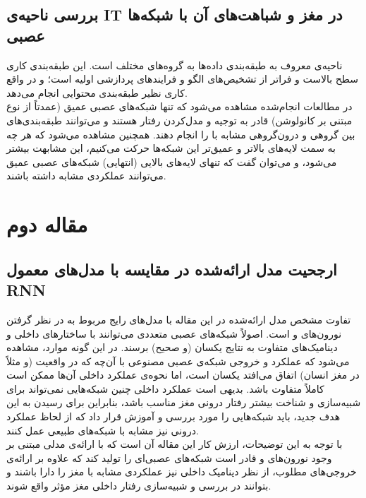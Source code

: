 \documentclass[a4paper]{article}
\begin{document}
	\subsection{بررسی ناحیه‌ی IT در مغز و شباهت‌های آن با شبکه‌ها عصبی}
	ناحیه‌ی 
	معروف به طبقه‌بندی داده‌ها به گروه‌های مختلف است. این طبقه‌بندی کاری سطح بالاست و فراتر از تشخیص‌های الگو و فرایندهای پردازشی اولیه است؛ و در واقع کاری نظیر طبقه‌بندی محتوایی انجام می‌دهد.\\
	
	در مطالعات انجام‌شده مشاهده می‌شود که تنها شبکه‌های عصبی عمیق  (عمدتاً از نوع مبتنی بر کانولوشن) قادر به توجیه و مدل‌کردن رفتار  هستند و می‌توانند طبقه‌بندی‌های بین گروهی و درون‌گروهی مشابه با  را انجام دهند. همچنین مشاهده می‌شود که هر چه به  سمت لایه‌های بالاتر و عمیق‌تر این شبکه‌ها حرکت می‌کنیم، این مشابهت بیشتر می‌شود، و می‌توان گفت که تنهای لایه‌های بالایی (انتهایی) شبکه‌های عصبی عمیق می‌توانند عملکردی مشابه  داشته باشند.

	\clearpage

\section{مقاله دوم}
\subsection{ارجحیت مدل ارائه‌شده در مقایسه با مدل‌های معمول RNN}
تفاوت مشخص مدل ارائه‌شده در این مقاله با مدل‌های رایج مربوط به در نظر گرفتن نورون‌های  و  است. اصولاً شبکه‌های عصبی متعددی می‌توانند با ساختارهای داخلی و دینامیک‌های متفاوت به نتایج یکسان (و صحیح) برسند. در این گونه موارد، مشاهده می‌شود که عملکرد و خروجی شبکه‌ی عصبی مصنوعی با آن‌چه که در واقعیت (و مثلاً در مغز انسان) اتفاق می‌افتد یکسان است، اما نحوه‌ی عملکرد داخلی آن‌ها ممکن است کاملاً متفاوت باشد. بدیهی است عملکرد داخلی چنین شبکه‌هایی نمی‌تواند برای شبیه‌سازی و شناخت بیشتر رفتار درونی مغز مناسب باشد، بنابراین برای رسیدن به این هدف جدید، باید شبکه‌هایی را مورد بررسی و آموزش قرار داد که از لحاظ عملکرد درونی نیز مشابه با شبکه‌های طبیعی عمل کنند.\\

با توجه به این توضیحات، ارزش کار این مقاله آن است که با ارائه‌ی مدلی مبتنی بر وجود نورون‌های  و  قادر است شبکه‌های عصبی‌ای را تولید کند که علاوه بر ارائه‌ی خروجی‌های مطلوب، از نظر دینامیک داخلی نیز عملکردی مشابه با مغز را دارا باشند و بتوانند در بررسی و شبیه‌سازی رفتار داخلی مغز مؤثر واقع شوند.
\end{document}
